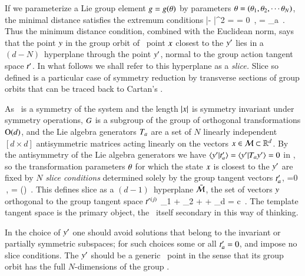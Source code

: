 If we parameterize a Lie group element $g=g({\bf \theta})$ by
parameters ${\bf \theta} = ({\bf \theta}_1,{\bf \theta}_2,\cdots{\bf \theta}_N)$, the minimal
distance satisfies the extremum conditions
\beq
{} |\ssp - \LieEl\slicep|^2
   =
   = 0
    \,,\qquad
	   = \Lg_a \slicep
\,.
\label{PCsectQ}
\eeq
Thus the minimum distance condition, combined with the Euclidean norm, says
that the point $y$ in the group orbit of \statesp\ point $x$
closest to the {\template} ${y'}$ lies in a $(d\!-\!N)$\dmn\ hyperplane
through the point ${y'}$, normal to the group action tangent space
$t'_{}$. In what follows we shall refer to this hyperplane as a
\emph{slice.} Slice so defined is a particular case of symmetry reduction
by transverse sections of group
orbits that can be traced back to
Cartan's \mframes{}.

As \Group\ is a symmetry of the system and the length $|x|$ is
symmetry invariant under symmetry operations, $G$ is a subgroup of
the group of orthogonal transformations $\textrm{O}(d)$, and the Lie algebra
{generators} $T_a$ are a set of $N$ linearly independent
$[d\!\times\!d]$ antisymmetric matrices acting linearly on the {\statesp}
vectors $x \in {\cal M} \subset \mathbb{R}^d$. By the antisymmetry of the Lie
algebra generators we have $\braket{\slicep}{\sliceTan{a}} =
\braket{\slicep}{\Lg_{a}\slicep}=0$ in , so the
transformation parameters ${\bf \theta}$ for which the state $x$ is closest
to the {\template} ${y'}$ are fixed by $N$ \emph{slice conditions} determined
solely by the group tangent vectors $t'_{a}$,
\beq
{} =0
    \,,\qquad
\sspRed = \LieEl(\gSpace) \ssp
\,.
This defines slice as a $(d\!-\!1)$\dmn\ hyperplane $\bar{\cal M}$, the set of
vectors $y$ orthogonal to the group tangent space
$t'_{}{}^{(j)}$
\beq
\sspRed_1 + \sspRed_2 + \cdots + \sspRed_d = c
\,.
The template tangent space \sliceTan{} is the primary object, the
{\template} \slicep\ itself secondary in this way of thinking.

In the choice of ${y'}$ one should avoid solutions that belong to the
invariant or partially symmetric subspaces; for such choices some or all
$t'_{a}=0$, and impose no slice conditions. The {\template}
${y'}$ should be a generic \statesp\ point in the sense that its group
orbit has the full $N$-dimensions of the group \Group.

